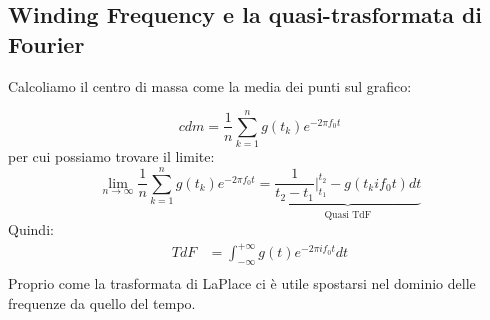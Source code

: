 \documentclass[a4paper]{article}
\begin{document}
\subsection{Winding Frequency e la quasi-trasformata di Fourier}

Calcoliamo il centro di massa come la media dei punti sul grafico:

\[cdm = \frac{1}{n} \sum_{k=1}^n g(t_k)e^{-2\pi f_0t}\]
per cui possiamo trovare il limite:
\[\lim_{n \rightarrow \infty} \frac{1}{n} \sum_{k=1}^n g(t_k)e^{-2\pi f_0t} = \underbrace{\frac{1}{t_2 - t_1}\bigg|_{t_1}^{t_2} -g(t_k i f_0t) dt}_{\text{Quasi TdF}}\]
Quindi:
\begin{align*}
    TdF &= \int_{-\infty}^{+\infty} g(t)e^{-2\pi i f_0t} dt\\
\end{align*}
Proprio come la trasformata di LaPlace ci è utile spostarsi nel dominio delle frequenze da quello del tempo.
\end{document}
